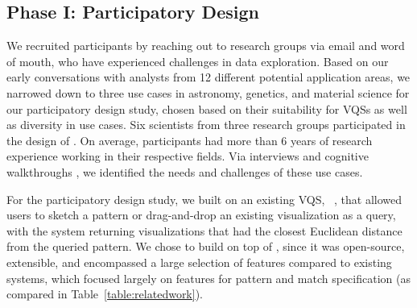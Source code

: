 \subsection{Phase I: Participatory Design}
\par We recruited participants by reaching out to research groups via email and word of mouth, who have experienced challenges in data exploration. Based on our early conversations with analysts from 12 different potential application areas, we narrowed down to three use cases in astronomy, genetics, and material science for our participatory design study, chosen based on their suitability for VQSs as well as diversity in use cases. Six scientists from three research groups participated in the design of \zvpp. On average, participants had more than 6 years of research experience working in their respective fields. Via interviews and cognitive walkthroughs , we identified the needs and challenges of these use cases. %
\par For the participatory design study, we built on an existing VQS, \zv~\cite{Siddiqui2017,Siddiqui2017VLDB}, that allowed users to sketch a pattern or drag-and-drop an existing visualization as a query, with the system returning visualizations that had the closest Euclidean distance from the queried pattern. We chose to build on top of \zv, since it was open-source, extensible, and encompassed a large selection of features compared to existing systems, which focused largely on features for pattern and match specification (as compared in Table~\ref{table:relatedwork}). 

